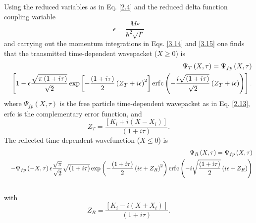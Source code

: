 \documentclass[preprint,aps]{revtex4}
\begin{document}
Using the reduced variables as in Eq. \ref{2.4} and the reduced delta
function coupling variable
\begin{equation}
\epsilon =\frac{M\varepsilon }{\hbar ^{2}\sqrt{\Gamma }}  \label{3.16}
\end{equation}%
and carrying out the momentum integrations in Eqs. \ref{3.14} and \ref{3.15}
one finds that the transmitted time-dependent wavepacket ($X\geq 0$) is
\begin{eqnarray}
&&\Psi _{T}\left( X,\tau \right) =\Psi _{fp}\left( X,\tau \right)  \notag \\
&&\left[ 1-\epsilon \frac{\sqrt{\pi \left( 1+i\tau \right) }}{\sqrt{2}}\exp %
\left[ -\frac{\left( 1+i\tau \right) }{2}\left( Z_{T}+i\epsilon \right) ^{2}%
\right] \mathrm{{erf}c}\left( -\frac{i\sqrt{\left( 1+i\tau \right) }}{\sqrt{2%
}}\left( Z_{T}+i\epsilon \right) \right) \right] .  \label{3.17}
\end{eqnarray}%
where $\Psi _{fp}\left( X,\tau \right) $ is the free particle time-dependent
wavepacket as in Eq. \ref{2.13}, $\mathrm{erfc}$ is the complementary
error function, and
\begin{equation}
Z_{T}=\frac{\left[ K_{i}+i\left( X-X_{i}\right) \right] }{\left( 1+i\tau
\right) }.  \label{3.18}
\end{equation}%
The reflected time-dependent wavefunction ($X\leq 0$) is
\begin{eqnarray}
&&\Psi _{R}\left( X,\tau \right) =\Psi _{fp}\left( X,\tau \right)  \notag \\
&&-\Psi _{fp}\left( -X,\tau \right) \epsilon \frac{\sqrt{\pi }}{\sqrt{2}}%
\sqrt{\left( 1+i\tau \right) }\exp \left( -\frac{\left( 1+i\tau \right) }{2}%
\left( i\epsilon +Z_{R}\right) ^{2}\right) \mathrm{\mathrm{{erf}c}}\left( -i%
\sqrt{\frac{\left( 1+i\tau \right) }{2}}\left( i\epsilon +Z_{R}\right)
\right)  \notag \\
&&  \label{3.19}
\end{eqnarray}%
with
\begin{equation}
Z_{R}=\frac{\left[ K_{i}-i\left( X+X_{i}\right) \right] }{\left( 1+i\tau
\right) }.  \label{3.20}
\end{equation}
\end{document}

